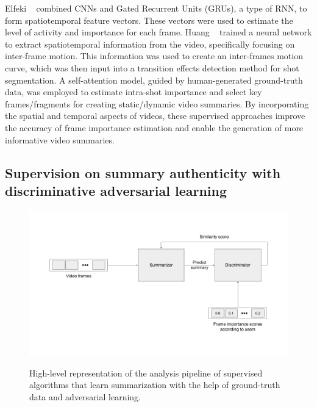 		Elfeki \etal~\cite{elfeki2019video} combined CNNs and Gated Recurrent Units (GRUs), a type of RNN, to form spatiotemporal feature vectors. These vectors were used to estimate the level of activity and importance for each frame. Huang \etal~\cite{huang2019novel} trained a neural network to extract spatiotemporal information from the video, specifically focusing on inter-frame motion. This information was used to create an inter-frames motion curve, which was then input into a transition effects detection method for shot segmentation. A self-attention model, guided by human-generated ground-truth data, was employed to estimate intra-shot importance and select key frames/fragments for creating static/dynamic video summaries. By incorporating the spatial and temporal aspects of videos, these supervised approaches improve the accuracy of frame importance estimation and enable the generation of more informative video summaries.

	\subsection{Supervision on summary authenticity with discriminative adversarial learning}
	\label{subsec:rel-sup-discriminative}

		\begin{figure}[ht]
			\caption{High-level representation of the analysis pipeline of supervised algorithms that learn summarization with the help of ground-truth data and adversarial learning.}
			\includegraphics[width=0.73\paperwidth]{content/related/figures/sup-gan.png}
			\label{figure:rel-sup-gan}
		\end{figure}

